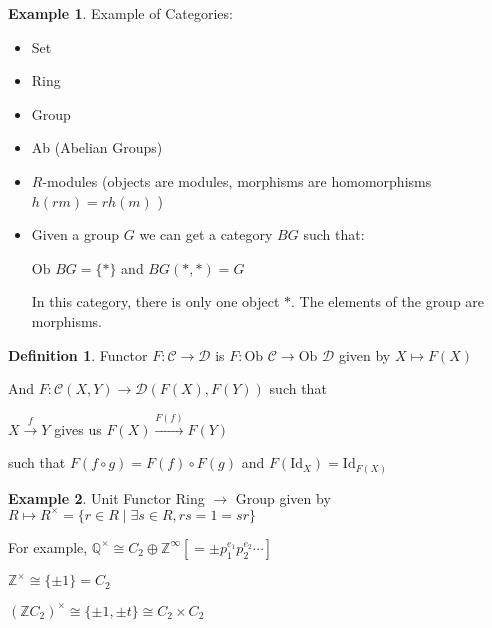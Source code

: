 \documentclass{article}
\theoremstyle{definition}
\newtheorem*{example}{Example}
\newtheorem*{definition}{Definition}
\begin{document}
\begin{example}

    Example of Categories:

    \begin{itemize}
        \item Set 
        \item Ring
        \item Group
        \item Ab (Abelian Groups)
        \item \(R\)-modules (objects are modules, morphisms are homomorphisms \(h(rm) = rh(m)\) )
        \item Given a group \(G\) we can get a category \(BG\) such that:

        \(\text{Ob } BG = \{ \ast \} \)  and \(BG(\ast,\ast) = G\) 
        
        In this category, there is only one object \(\ast\). The elements of the group are morphisms.
        
    \end{itemize} 



\end{example}

\begin{definition}
    Functor \(F: \mathcal{C} \to \mathcal{D}\) is \(F: \text{Ob } \mathcal{C} \to \text{Ob } \mathcal{D}\) given by \(X \mapsto F(X)\)

    And \(F: \mathcal{C} (X,Y) \to \mathcal{D}(F(X),F(Y))\) such that

    \(X \overset{f}{\to} Y\) gives us \(F(X) \overset{F(f)}{\to} F(Y)\) 

    such that \(F(f\circ g) = F(f)\circ F(g)\) and \(F(\text{Id}_X) = \text{Id}_{F(X)}\) 
\end{definition}

\begin{example}

    Unit Functor Ring \(\to\) Group given by \(R \mapsto R^\times = \{ r\in R \mid \exists s\in R, rs = 1 = sr \} \)

    For example, \(\mathbb{Q} ^\times \cong C_2 \oplus \mathbb{Z} ^{\infty} [=\pm p_1^{e_1}p_2^{e_2}\cdots]\) 

    \(\mathbb{Z} ^\times \cong \{ \pm 1 \} = C_2\) 

    \((\mathbb{Z} C_2)^\times \cong \{ \pm 1, \pm t \} \cong C_2 \times C_2\)

\end{example}
\end{document}
